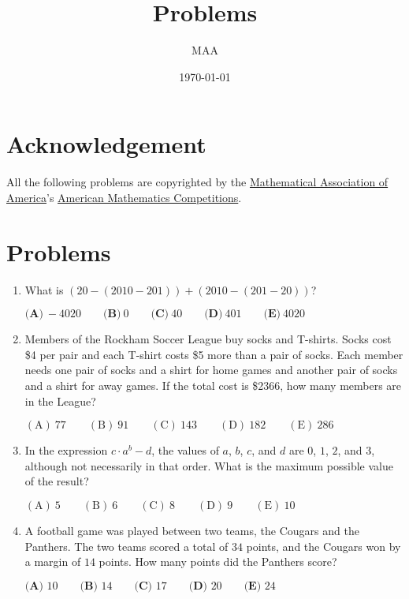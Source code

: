 \documentclass{article}%
\title{Problems}%
\author{MAA}%
\date{\today}%
\begin{document}
%
\normalsize%
\maketitle%
\section*{Acknowledgement}%
\label{sec:Acknowledgement}%
All the following problems are copyrighted by the \href{https://www.maa.org/}{Mathematical Association of America}'s \href{https://www.maa.org/math-competitions}{American Mathematics Competitions}.

%
\clearpage%
\section*{Problems}%
\label{sec:Problems}%
\begin{enumerate}%
\item%
What is $\left(20-\left(2010-201\right)\right)+\left(2010-\left(201-20\right)\right)$?

$\textbf{(A)}\ -4020 \qquad \textbf{(B)}\ 0 \qquad \textbf{(C)}\ 40 \qquad \textbf{(D)}\ 401 \qquad \textbf{(E)}\ 4020$

%
\item%
Members of the Rockham Soccer League buy socks and T-shirts. Socks cost \$4 per pair and each T-shirt costs \$5 more than a pair of socks. Each member needs one pair of socks and a shirt for home games and another pair of socks and a shirt for away games. If the total cost is \$2366, how many members are in the League? 

$\mathrm{(A) \ } 77\qquad \mathrm{(B) \ } 91\qquad \mathrm{(C) \ } 143\qquad \mathrm{(D) \ } 182\qquad \mathrm{(E) \ } 286$

%
\item%
In the expression $c\cdot a^b-d$, the values of $a$, $b$, $c$, and $d$ are $0$, $1$, $2$, and $3$, although not necessarily in that order. What is the maximum possible value of the result?

$\mathrm{(A)\ }5\qquad\mathrm{(B)\ }6\qquad\mathrm{(C)\ }8\qquad\mathrm{(D)\ }9\qquad\mathrm{(E)\ }10$

%
\item%
A football game was played between two teams, the Cougars and the Panthers. The two teams scored a total of $34$ points, and the Cougars won by a margin of $14$ points. How many points did the Panthers score? 

$\textbf{(A) } 10\qquad \textbf{(B) } 14\qquad \textbf{(C) } 17\qquad \textbf{(D) } 20\qquad \textbf{(E) } 24$


\end{enumerate}
\end{document}

